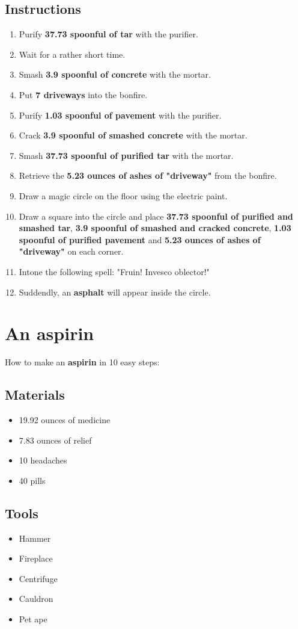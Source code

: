 \documentclass{article}
\begin{document}
\subsection{Instructions}\begin{enumerate}
\item 
Purify \textbf{37.73 spoonful of tar} with the purifier.
\item 
Wait for a rather short time.
\item 
Smash \textbf{3.9 spoonful of concrete} with the mortar.
\item 
Put \textbf{7 driveways} into the bonfire.
\item 
Purify \textbf{1.03 spoonful of pavement} with the purifier.
\item 
Crack \textbf{3.9 spoonful of smashed concrete} with the mortar.
\item 
Smash \textbf{37.73 spoonful of purified tar} with the mortar.
\item 
Retrieve the \textbf{5.23 ounces of ashes of "driveway"} from the bonfire.
\item 
Draw a magic circle on the floor using the electric paint.
\item 
Draw a square into the circle and place \textbf{37.73 spoonful of purified and smashed tar}, \textbf{3.9 spoonful of smashed and cracked concrete}, \textbf{1.03 spoonful of purified pavement} and \textbf{5.23 ounces of ashes of "driveway"} on each corner.
\item 
Intone the following spell: "Fruin! Invesco oblector!"
\item 
Suddendly, an \textbf{asphalt} will appear inside the circle.
\end{enumerate}
\newpage
\section{An aspirin}How to make an \textbf{aspirin} in 10 easy steps:

\subsection{Materials}\begin{itemize}
\item 
19.92 ounces of medicine
\item 
7.83 ounces of relief
\item 
10 headaches
\item 
40 pills
\end{itemize}
\subsection{Tools}\begin{itemize}
\item 
Hammer
\item 
Fireplace
\item 
Centrifuge
\item 
Cauldron
\item 
Pet ape
\end{itemize}
\end{document}
